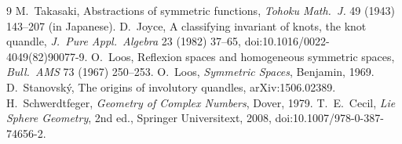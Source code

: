 \documentclass[10pt]{article}
\theoremstyle{definition}\newtheorem{definition}[theorem]{Definition}\newtheorem{remark}[theorem]{Remark}
\begin{document}
\begin{thebibliography}{9}\small
{} M.~Takasaki, Abstractions of symmetric functions, \emph{Tohoku Math.\ J.} 49 (1943) 143--207 (in Japanese).
 D.~Joyce, A classifying invariant of knots, the knot quandle, \emph{J.\ Pure Appl.\ Algebra} 23 (1982) 37--65, doi:10.1016/0022-4049(82)90077-9.
 O.~Loos, Reflexion spaces and homogeneous symmetric spaces, \emph{Bull.\ AMS} 73 (1967) 250--253.
 O.~Loos, \emph{Symmetric Spaces}, Benjamin, 1969.
 D.~Stanovsk\'y, The origins of involutory quandles, arXiv:1506.02389.
 H.~Schwerdtfeger, \emph{Geometry of Complex Numbers}, Dover, 1979.
 T.~E.~Cecil, \emph{Lie Sphere Geometry}, 2nd ed., Springer Universitext, 2008, doi:10.1007/978-0-387-74656-2.
\end{thebibliography}
\end{document}
